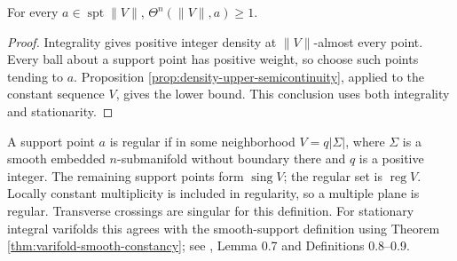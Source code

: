 \begin{corollary}\label{cor:integral-support-density}
For every $a\in\operatorname{spt}\|V\|$, $\Theta^n(\|V\|,a)\geq1$.
\end{corollary}
\begin{proof}
Integrality gives positive integer density at $\|V\|$-almost every point. Every ball about a support point has positive weight, so choose such points tending to $a$. Proposition \ref{prop:density-upper-semicontinuity}, applied to the constant sequence $V$, gives the lower bound. This conclusion uses both integrality and stationarity.
\end{proof}

\begin{definition}\label{def:varifold-regular-singular}
A support point $a$ is regular if in some neighborhood $V=q|\Sigma|$, where $\Sigma$ is a smooth embedded $n$-submanifold without boundary there and $q$ is a positive integer. The remaining support points form $\operatorname{sing}V$; the regular set is $\operatorname{reg}V$. Locally constant multiplicity is included in regularity, so a multiple plane is regular. Transverse crossings are singular for this definition. For stationary integral varifolds this agrees with the smooth-support definition using Theorem \ref{thm:varifold-smooth-constancy}; see \cite{Minter}, Lemma 0.7 and Definitions 0.8--0.9.
\end{definition}

